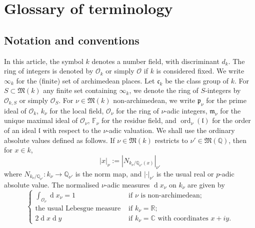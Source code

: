 \documentclass[11pt,letterpaper]{amsart}
\newcommand{\BC}{{\mathbb {C}}}
\newcommand{\BF}{{\mathbb {F}}}
\newcommand{\BQ}{{\mathbb {Q}}}
\newcommand{\BR}{{\mathbb {R}}}
\newcommand{\CO}{{\mathcal {O}}}
\theoremstyle{plain}
\numberwithin{equation}{section}
\theoremstyle{definition}
\theoremstyle{remark}
\begin{document}
\section{Glossary of terminology}\label{se:preliminary}
\subsection{Notation and conventions}
In this article, the symbol $k$ denotes a number field, with discriminant $d_k$. The ring of integers is denoted by $\CO_k$ or simply $\CO$ if $k$ is considered fixed. We write $\infty_k$ for the (finite) set of archimedean places. Let $\mathfrak{c}_k$ be the class group of $k$. For $S\subset\mathfrak{M}(k)$ any finite set containing $\infty_k$, we denote the ring of $S$-integers by $\CO_{k,S}$ or simply $\CO_{S}$.  For $\nu\in\mathfrak{M}(k)$ non-archimedean, we write $\mathfrak{p}_\nu$ for the prime ideal of $\CO_k$, $k_{\nu}$ for the local field, $\CO_{\nu}$ for the ring of $\nu$-adic integers, $\mathfrak{m}_{\nu}$ for the unique maximal ideal of $\CO_{\nu}$, $\BF_\nu$ for the residue field, and $\operatorname{ord}_{\nu}(\mathfrak{l})$ for the order of an ideal $\mathfrak{l}$ with respect to the $\nu$-adic valuation. We shall use the ordinary absolute values defined as follows. If $\nu\in\mathfrak{M}(k)$ restricts to $\nu'\in\mathfrak{M}(\BQ)$, then for $x\in k$, $$|x|_\nu:=\left|N_{k_{\nu}/\BQ_{\nu'}(x)}\right|_{\nu'}$$ where $N_{k_{\nu}/\BQ_{\nu'}}:k_{\nu}\to\BQ_{\nu'}$ is the norm map, and $|\cdot|_{\nu'}$ is the usual real or $p$-adic absolute value. 
The normalised $\nu$-adic measures $\operatorname{d}x_\nu$ on $k_\nu$ are given by
\begin{equation}\label{eq:nuadicmeasurenormal}
	\begin{cases}
		\int_{\CO_{\nu}} \operatorname{d}x_\nu =1 &\text{ if } \nu \text{  is non-archimedean};\\
		\text{the usual Lebesgue measure} &\text{ if } k_\nu=\BR;\\
		2\operatorname{d}x\operatorname{d}y &\text{ if } k_\nu=\BC \text{ with coordinates }x+iy.
	\end{cases}
\end{equation}
\end{document}
